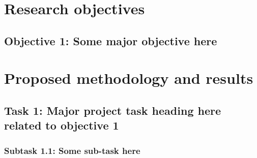 


\section{Research objectives}                   %

\blindtext

\subsection*{Objective 1: Some major objective here}

\blindtext










\section{Proposed methodology and results}  %

\blindtext

\subsection{Task 1: Major project task heading here related to objective 1}

\blindtext


\subsubsection*{Subtask 1.1: Some sub-task here}

